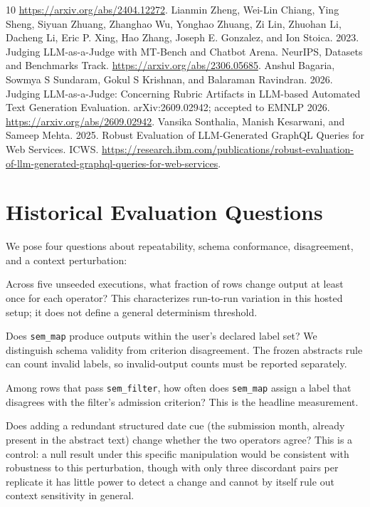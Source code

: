 \documentclass[11pt]{article}
\begin{document}
\begin{thebibliography}{10}
\url{https://arxiv.org/abs/2404.12272}.
 Lianmin Zheng, Wei-Lin Chiang, Ying Sheng, Siyuan Zhuang, Zhanghao Wu, Yonghao Zhuang, Zi Lin, Zhuohan Li, Dacheng Li, Eric P. Xing, Hao Zhang, Joseph E. Gonzalez, and Ion Stoica. 2023. Judging LLM-as-a-Judge with MT-Bench and Chatbot Arena. NeurIPS, Datasets and Benchmarks Track.
\url{https://arxiv.org/abs/2306.05685}.
 Anshul Bagaria, Sowmya S Sundaram, Gokul S Krishnan, and Balaraman Ravindran. 2026. Judging LLM-as-a-Judge: Concerning Rubric Artifacts in LLM-based
Automated Text Generation Evaluation. arXiv:2609.02942; accepted to EMNLP 2026.
\url{https://arxiv.org/abs/2609.02942}.
 Vansika Sonthalia, Manish Kesarwani, and Sameep Mehta. 2025. Robust Evaluation of LLM-Generated GraphQL Queries for Web
Services. ICWS.
\url{https://research.ibm.com/publications/robust-evaluation-of-llm-generated-graphql-queries-for-web-services}.
\end{thebibliography}

\clearpage
\appendix

\section{Historical Evaluation Questions}
\label{app:questions}

We pose four questions about repeatability, schema conformance, disagreement,
and a context perturbation:

\begin{description}[leftmargin=1em,style=unboxed]
\item[RQ1 (Individual repeatability).]
  Across five unseeded executions, what fraction of rows change output at
  least once for each operator? This characterizes run-to-run variation in
  this hosted setup; it does not define a general determinism threshold.
\item[RQ2 (Schema conformance).]
  Does \texttt{sem\_map} produce outputs within the user's declared label
  set? We distinguish schema validity from criterion disagreement. The
  frozen abstracts rule can count invalid labels, so invalid-output counts
  must be reported separately.
\item[RQ3 (Cross-operator disagreement).]
  Among rows that pass \texttt{sem\_filter}, how often does
  \texttt{sem\_map} assign a label that disagrees with the filter's
  admission criterion?
  This is the headline measurement.
\item[RQ4 (Context sensitivity).]
  Does adding a redundant structured date cue (the submission month,
  already present in the abstract text) change whether the two operators
  agree?  This is a control: a null result under this specific manipulation
  would be consistent with robustness to this perturbation, though with only
  three discordant pairs per replicate it has little power to detect a change
  and cannot by itself rule out context sensitivity in general.
\end{description}
\end{document}
